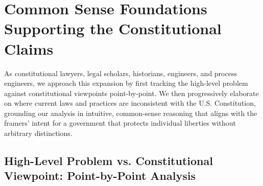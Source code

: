 ﻿\section{Common Sense Foundations Supporting the Constitutional Claims}

As constitutional lawyers, legal scholars, historians, engineers, and process engineers, we approach this expansion by first tracking the high-level problem against constitutional viewpoints point-by-point. We then progressively elaborate on where current laws and practices are inconsistent with the U.S. Constitution, grounding our analysis in intuitive, common-sense reasoning that aligns with the framers' intent for a government that protects individual liberties without arbitrary distinctions.

\subsection{High-Level Problem vs. Constitutional Viewpoint: Point-by-Point Analysis}
